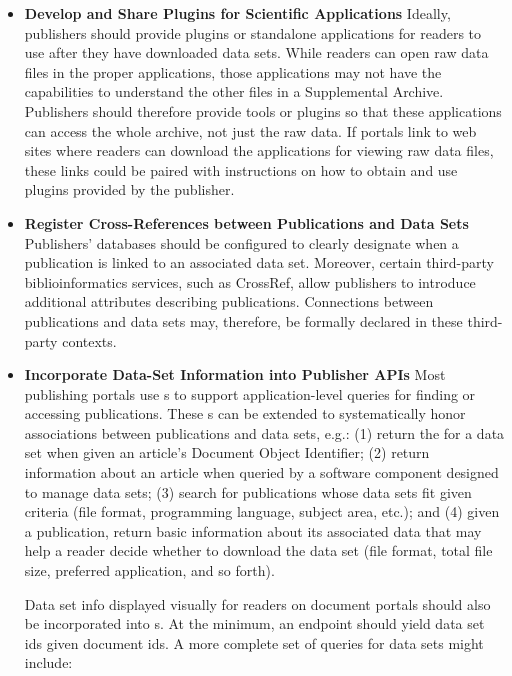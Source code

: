 \documentclass[12pt,letterpaper]{article}
\newcommand{\URL}{\resizebox{!}{8pt}{\AcronymText{URL}}}
\newcommand{\API}{\resizebox{!}{8pt}{\AcronymText{API}}}
\newcommand{\textscc}[1]{{\color{orr!35!black}{{%
{\textsc{\textbf{#1}}}}}}}
\newcommand{\AcronymText}[1]{{\textscc{#1}}}
\begin{document}
{{\begin{description}
\begin{itemize}
\item{} \textbf{Develop and Share Plugins for Scientific Applications} \hspace{14pt}   Ideally, publishers should provide plugins or standalone applications for readers to use after they have downloaded data sets.  While readers can open raw data files in the proper applications, those applications may not have the capabilities to understand the other files in a Supplemental Archive.  Publishers should therefore provide tools or plugins so that these applications can access the whole archive, not just the raw data.  If portals link to web sites where readers can download the applications for viewing raw data files, these links could be paired with instructions on how to obtain and use plugins provided by the publisher.


\item{} \textbf{Register Cross-References between Publications and 
Data Sets} \hspace{14pt} Publishers' databases should be configured to 
clearly designate when a publication is linked to an 
associated data set.  Moreover, certain third-party 
biblioinformatics services, such as CrossRef, allow 
publishers to introduce additional attributes describing 
publications.  Connections between publications and 
data sets may, therefore, be formally declared in these 
third-party contexts.

\item{} \textbf{Incorporate Data-Set Information into Publisher APIs}
\hspace{14pt} Most publishing portals use \API{}s to support application-level 
queries for finding or accessing publications.  These \API{}s 
can be extended to systematically honor associations between 
publications and data sets, e.g.: (1) return the \URL{} for a 
data set when given an article's Document Object Identifier; 
(2) return information about an article when queried by a 
software component designed to manage data sets; (3) search 
for publications whose data sets fit given criteria 
(file format, programming language, subject area, etc.); and 
(4) given a publication, return basic information about its associated 
data that may help a reader decide whether to 
download the data set (file format, total file size, preferred application, 
and so forth).

Data set info displayed visually for readers on document portals should also be incorporated into 
\API{}s.  At the minimum, an \API{} endpoint should yield data set ids given document ids.  A more complete set of \API{} queries for data sets might include:


\end{itemize}
\end{description}}}
\end{document}

